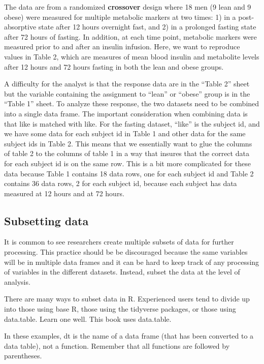 \documentclass[]{book}
\begin{document}
The data are from a randomized \textbf{crossover} design where 18 men (9
lean and 9 obese) were measured for multiple metabolic markers at two
times: 1) in a post-absorptive state after 12 hours overnight fast, and
2) in a prolonged fasting state after 72 hours of fasting. In addition,
at each time point, metabolic markers were measured prior to and after
an insulin infusion. Here, we want to reproduce values in Table 2, which
are measures of mean blood insulin and metabolite levels after 12 hours
and 72 hours fasting in both the lean and obese groups.

A difficulty for the analyst is that the response data are in the
``Table 2'' sheet but the variable containing the assignment to ``lean''
or ``obese'' group is in the ``Table 1'' sheet. To analyze these
response, the two datasets need to be combined into a single data frame.
The important consideration when combining data is that like is matched
with like. For the fasting dataset, ``like'' is the subject id, and we
have some data for each subject id in Table 1 and other data for the
same subject ids in Table 2. This means that we essentially want to glue
the columns of table 2 to the columns of table 1 in a way that insures
that the correct data for each subject id is on the same row. This is a
bit more complicated for these data because Table 1 contains 18 data
rows, one for each subject id and Table 2 contains 36 data rows, 2 for
each subject id, because each subject has data measured at 12 hours and
at 72 hours.

\subsection{Subsetting data}\label{subsetting-data}

It is common to see researchers create multiple subsets of data for
further processing. This practice should be be discouraged because the
same variables will be in multiple data frames and it can be hard to
keep track of any processing of variables in the different datasets.
Instead, subset the data at the level of analysis.

There are many ways to subset data in R. Experienced users tend to
divide up into those using base R, those using the tidyverse packages,
or those using data.table. Learn one well. This book uses data.table.

In these examples, dt is the name of a data frame (that has been
converted to a data table), not a function. Remember that all functions
are followed by parentheses.
\end{document}
